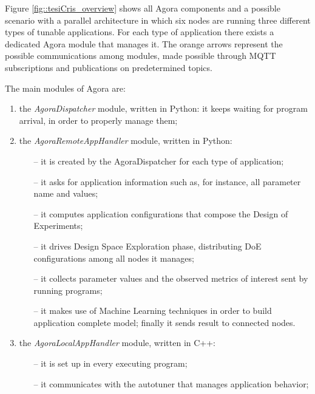 Figure \ref{fig::tesiCris_overview} shows all Agora components and a possible scenario with a parallel architecture in which six nodes are running three different types of tunable applications. For each type of application there exists a dedicated Agora module that manages it. The orange arrows represent the possible communications among modules, made possible through MQTT subscriptions and publications on predetermined topics.

The main modules of Agora are:

\begin{enumerate}

    \item the \textit{AgoraDispatcher} module, written in Python: it keeps waiting for program arrival, in order to properly manage them;
    
    \item the \textit{AgoraRemoteAppHandler} module, written in Python:
	\begin{itemize}	
		\item [--] it is created by the AgoraDispatcher for each type of application;

		\item [--] it asks for application information such as, for instance, all parameter name and values;

		\item [--] it computes application configurations that compose the Design of Experiments;

		\item [--] it drives Design Space Exploration phase, distributing DoE configurations among all nodes it manages;

		\item [--] it collects parameter values and the observed metrics of interest sent by running programs;

		\item [--] it makes use of Machine Learning techniques in order to build application complete model; finally it sends result to connected nodes.
	\end{itemize}
    
    \item the \textit{AgoraLocalAppHandler} module, written in C++:
	\begin{itemize}
		\item [--] it is set up in every executing program;

		\item [--] it communicates with the autotuner that manages application behavior;


\end{itemize}
\end{enumerate}

